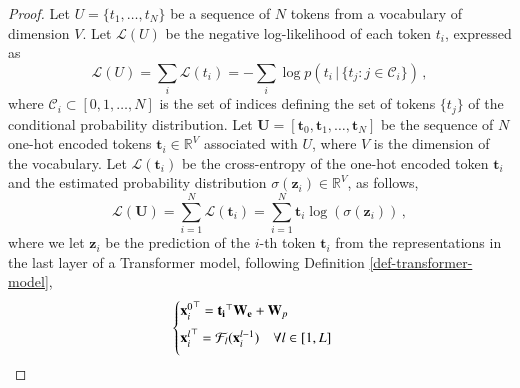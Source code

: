 \begin{proof}
%
Let $U = \{t_1, \dots, t_N\}$ be a  sequence of $N$ tokens from a vocabulary of dimension $V$.
%
Let $\mathcal{L}(U)$ be the negative log-likelihood of each token $t_i$, expressed as
%
\begin{equation}
\label{eq:results:self-supervised-pretraining}
    \mathcal{L}(U) = \sum_i \mathcal{L}(t_i)=  - \sum_i \log p(t_i \,|\, \{t_j : j \in  \mathcal{C}_i\}) \,,
\end{equation}
%
where $\mathcal{C}_i \subset [0,1,\dots, N]$ is the set of indices defining the set of tokens $\{t_j\}$ of the conditional probability distribution.
%
Let $\bm{U} = [\bm{t}_0, \bm{t}_1, \dots, \bm{t}_N]$ be the sequence of $N$ one-hot encoded tokens $\bm{t}_i \in \mathbb{R}^V$ associated with $U$, where $V$ is the dimension of the vocabulary.
%
Let $\mathcal{L}(\bm{t}_i)$ be the cross-entropy of the one-hot encoded token $\bm{t}_i$  and the estimated probability distribution $\sigma(\bm{z}_i) \in \mathbb{R}^V$, as follows,
%
\begin{equation}
 \mathcal{L}(\bm{U}) = \sum_{i=1}^N \mathcal{L}(\bm{t}_i) = \sum_{i=1}^N \bm{t}_i\log(\sigma(\bm{z}_i))\,,
\end{equation}
%
where we let $\bm{z}_i$ be the prediction of the $i$-th token $\bm{t}_i$ from the representations in the last layer of a Transformer model, following Definition \ref{def-transformer-model},
%
%
%
%
\begin{equation}
\begin{cases}
%
{\bm{x}^0_i}^\top = \bm{t_i}^\top \bm{W_e} + \bm{W}_p \\[5pt]
\vspace{5pt}
{\bm{x}_i^l}^\top = \mathcal{F}_l(\bm{x}_i^{l-1})\quad \forall l \in [1, L] \\

\end{cases}
\end{equation}
\end{proof}
